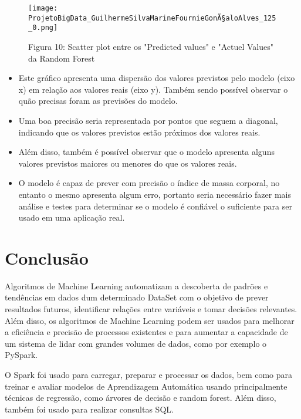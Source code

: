 \documentclass[11pt]{article}
\providecommand{\tightlist}{%
      \setlength{\itemsep}{0pt}\setlength{\parskip}{0pt}}
\begin{document}
\begin{figure}[h]
   \centering
   \texttt{[image: ProjetoBigData\_GuilhermeSilvaMarineFournieGonÃ§aloAlves\_125\_0.png]}
   \pagebreak
    \caption{Figura 10: Scatter plot entre os "Predicted values" e "Actuel Values" da Random Forest}
    \pagebreak
   \label{fig:scatterPlot2}
\end{figure}
    
    \begin{itemize}
\tightlist
\item
  Este gráfico apresenta uma dispersão dos valores previstos pelo modelo
  (eixo x) em relação aos valores reais (eixo y). Também sendo possível
  observar o quão precisas foram as previsões do modelo.
\item
  Uma boa precisão seria representada por pontos que seguem a diagonal,
  indicando que os valores previstos estão próximos dos valores reais.
\item
  Além disso, também é possível observar que o modelo apresenta alguns
  valores previstos maiores ou menores do que os valores reais.
\item
  O modelo é capaz de prever com precisão o índice de massa corporal, no
  entanto o mesmo apresenta algum erro, portanto seria necessário fazer
  mais análise e testes para determinar se o modelo é confiável o
  suficiente para ser usado em uma aplicação real.
\end{itemize}

    \hypertarget{conclusuxe3o}{%
\section{Conclusão}\label{conclusuxe3o}}


Algoritmos de Machine Learning automatizam a descoberta de padrões e tendências em dados dum determinado DataSet com o objetivo de prever resultados futuros, identificar relações entre variáveis e tomar decisões relevantes.
Além disso, os algoritmos de Machine Learning podem ser usados para melhorar a eficiência e precisão de processos existentes e para aumentar a capacidade de um sistema de lidar com grandes volumes de dados, como por exemplo o PySpark.

O Spark foi usado para carregar, preparar e processar os dados, bem como para treinar e avaliar modelos de Aprendizagem Automática usando principalmente técnicas de regressão, como árvores de decisão e random forest. Além disso, também foi usado para realizar consultas SQL.
\end{document}
